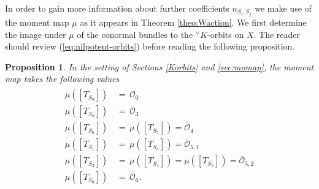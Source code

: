 \documentclass[a4paper, 11pt]{article}
\newtheorem{prop}[theo]{Proposition}
\begin{document}
In order to gain more information about further coefficients $n_{S_{i}, S_{j}}$
we make use of the moment map $\mu$ as it appears in Theorem \ref{theo:Waction}.
We first determine the image under $\mu$ of the conormal bundles to
the ${^\vee}K$-orbits on $X$.   The reader should review
(\ref{eq:nilpotent-orbits}) before reading the following proposition.
\begin{prop}\label{prop:momentmapimage}
In the setting of Sections \ref{Korbits} and \ref{sec:momap}, the moment map 
takes the following values
\begin{align*}%
\begin{aligned}
\mu([T_{S_9}])\, &=\,\mathcal{O}_{0}\\
\mu([T_{S_8}])\, &=\,\overline{\mathcal{O}}_{3}\\
\mu([T_{S_6}])\, &=\,\mu([T_{S_7}])=\overline{\mathcal{O}}_{4}\\
\mu([T_{S_1}])\, &=\,\mu([T_{S_3}])=\overline{\mathcal{O}}_{5,1}\\
\mu([T_{S_2}])\, &=\,\mu([T_{S_4}])=\mu([T_{S_5}])=\overline{\mathcal{O}}_{5,2}\\
\mu([T_{S_0}])\, &=\, \overline{\mathcal{O}}_6.\\
\end{aligned}
\end{align*}
\end{prop}
\end{document}
